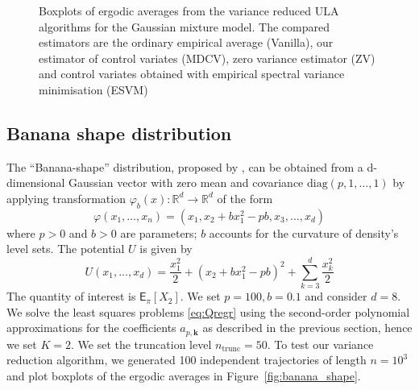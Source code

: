 \documentclass[bj]{imsart}
\def\PE{\mathsf{E}}
\def\rset{\mathbb{R}}
\def\rset{\mathbb{R}}
\begin{document}
 \begin{figure}[tbh]
\centering
{}
\qquad
{}
\caption{Boxplots of ergodic averages  from the variance reduced ULA algorithms for the Gaussian mixture model. The compared estimators are the ordinary empirical average  (Vanilla), our estimator of control variates (MDCV), zero variance estimator (ZV) and control variates obtained with empirical spectral variance minimisation (ESVM) 
\label{fig:GMM}}
\end{figure}

\subsection{Banana shape distribution}
The “Banana-shape” distribution, proposed by \cite{Haario1999}, can be obtained from a d-dimensional Gaussian vector with zero mean and covariance $\mathrm{diag}(p,1,\ldots,1)$ by applying transformation $\varphi_b(x) : \rset^d \rightarrow \rset^d$ of the form
\[
\varphi(x_1,\ldots,x_n) = (x_1, x_2 + bx^2_1 - pb,x_3,\ldots,x_d)
\]
where $p > 0$ and $b > 0$ are parameters; $b$ accounts for the curvature of density’s level sets. The potential $U$ is given by
\[
U(x_1, . . . , x_d) = \frac{x_1^2}{2} + (x_2 + bx_1^2 - pb)^2 + \sum\limits_{k=3}^{d}\frac{x_k^2}{2}
\]
The quantity of interest is $\PE_{\pi}[X_2]$. We set $p = 100, b = 0.1$ and consider $d=8$. We solve the least squares  problems \eqref{eq:Qregr} using the second-order polynomial approximations for the coefficients \(a_{p,\mathbf{k}}\) as described in the previous section, hence we set $K = 2$. We set the truncation level \(n_{\mathrm{trunc}} = 50\). To test our variance reduction algorithm, we generated 100 independent trajectories of length $n = 10^3$ and plot boxplots of the ergodic averages in Figure~\ref{fig:banana_shape}.
\end{document}
